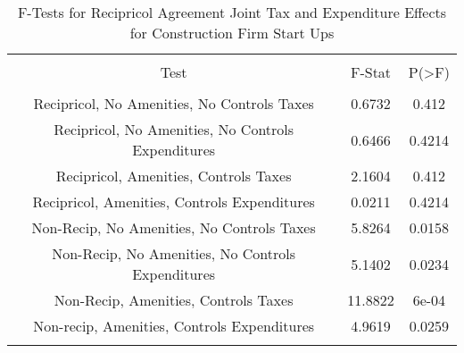 
\begin{table}[!htbp] \centering 
  \caption{F-Tests for Recipricol Agreement Joint Tax and Expenditure Effects for Construction Firm Start Ups} 
  \label{23Ftests} 
\begin{tabular}{@{\extracolsep{5pt}} ccc} 
\\[-1.8ex]\hline 
\hline \\[-1.8ex] 
Test & F-Stat & P(\textgreater F) \\ 
\hline \\[-1.8ex] 
Recipricol, No Amenities, No Controls Taxes & 0.6732 & 0.412 \\ 
Recipricol, No Amenities, No Controls Expenditures & 0.6466 & 0.4214 \\ 
Recipricol, Amenities, Controls Taxes & 2.1604 & 0.412 \\ 
Recipricol, Amenities, Controls Expenditures & 0.0211 & 0.4214 \\ 
Non-Recip, No Amenities, No Controls Taxes & 5.8264 & 0.0158 \\ 
Non-Recip, No Amenities, No Controls Expenditures & 5.1402 & 0.0234 \\ 
Non-Recip, Amenities, Controls Taxes & 11.8822 & 6e-04 \\ 
Non-recip, Amenities, Controls Expenditures & 4.9619 & 0.0259 \\ 
\hline \\[-1.8ex] 
\end{tabular} 
\end{table} 
